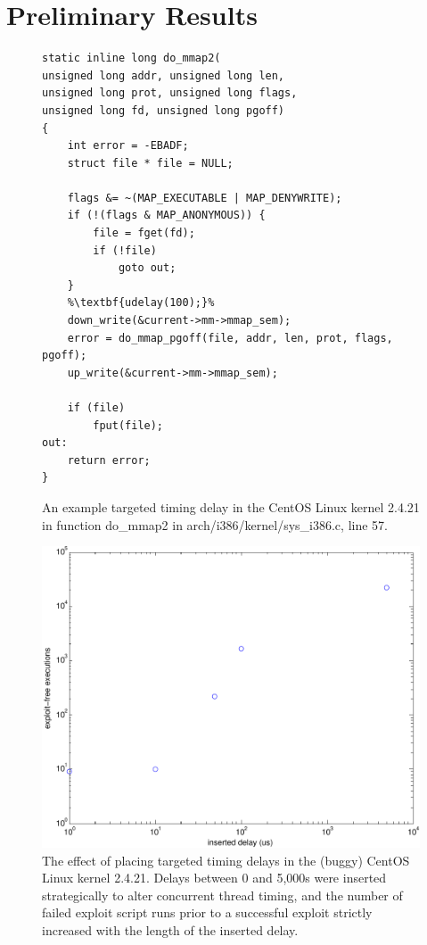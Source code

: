\documentclass[12pt,conference]{IEEEtran}
\begin{document}
\section{Preliminary Results}
\begin{figure}
\begin{lstlisting}[firstnumber=43]
static inline long do_mmap2(
unsigned long addr, unsigned long len,
unsigned long prot, unsigned long flags,
unsigned long fd, unsigned long pgoff)
{
	int error = -EBADF;
	struct file * file = NULL;

	flags &= ~(MAP_EXECUTABLE | MAP_DENYWRITE);
	if (!(flags & MAP_ANONYMOUS)) {
		file = fget(fd);
		if (!file)
			goto out;
	}
	%\textbf{udelay(100);}%
	down_write(&current->mm->mmap_sem);
	error = do_mmap_pgoff(file, addr, len, prot, flags, pgoff);
	up_write(&current->mm->mmap_sem);

	if (file)
		fput(file);
out:
	return error;
}
\end{lstlisting}
\caption{An example targeted timing delay in the CentOS Linux kernel 2.4.21 in function do\_mmap2 in arch/i386/kernel/sys\_i386.c, line 57.}
\label{fig_mmapcode}
\end{figure}
\begin{figure}
\centering
\includegraphics[width=\columnwidth]{prelimgraph}
\caption{The effect of placing targeted timing delays in the (buggy) CentOS Linux kernel 2.4.21.  Delays between 0 and 5,000{\textmu}s were inserted strategically to alter concurrent thread timing, and the number of failed exploit script runs prior to a successful exploit strictly increased with the length of the inserted delay.}
\label{fig_prelimgraph}
\end{figure}
\end{document}
